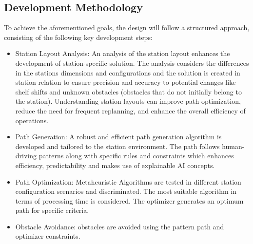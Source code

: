 \subsection{Development Methodology} %
To achieve the aforementioned goals, the design  will follow a structured approach, consisting of the following key 
development steps: 

\begin{itemize}
    \item Station Layout Analysis: An analysis of the station layout enhances the development 
    of station-specific solution. The analysis considers the differences in the stations dimensions
    and configurations and the solution is created in station relation to ensure precision and accuracy
    to potential changes like shelf shifts and unknown obstacles (obstacles that do not initially 
    belong to the station). Understanding station layouts can improve path optimization, reduce the need for 
    frequent replanning, and enhance the overall efficiency of operations.

    \item Path Generation: A robust and efficient path generation algorithm is developed and tailored to 
    the station environment. The path follows human-driving patterns along with specific rules and constraints 
    which enhances efficiency, predictability and makes use of explainable AI concepts.

    \item Path Optimization: Metaheuristic Algorithms are tested in different station configuration scenarios 
    and discriminated. The most suitable algorithm in terms of processing time is considered. The optimizer 
    generates an optimum path for specific criteria. 

    \item Obstacle Avoidance: obstacles are avoided using the pattern path and optimizer constraints.

\end{itemize}

